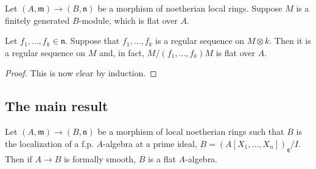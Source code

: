 \begin{corollary} Let $(A, \mathfrak{m}) \to (B, \mathfrak{n})$ be a morphism
of noetherian local rings.
Suppose $M$ is a finitely generated $B$-module, which is flat over $A$.

Let $f_1, \dots, f_k \in \mathfrak{n}$. Suppose that $f_1, \dots, f_k$ is a
regular sequence on $M \otimes k$. Then it is a regular sequence on $M$ and,
in fact, $M/(f_1, \dots, f_k ) M$ is flat over $A$.
\end{corollary} 
\begin{proof} 
This is now clear by induction. 
\end{proof} 

\subsection{The main result}
\begin{theorem}[EGA IV 17.5.1] Let $(A, \mathfrak{m}) \to (B, \mathfrak{n})$ be
a morphism of local noetherian rings such that $B$ is the localization of a f.p. $A$-algebra at a prime
ideal, $B = (A[X_1, \dots, X_n])_{\mathfrak{q}}/I$. Then if $A \to B$ is formally smooth, $B$ is a flat $A$-algebra.
\end{theorem} 
